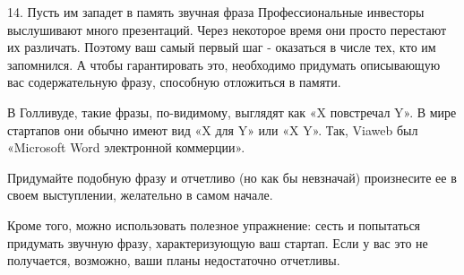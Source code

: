 \documentclass[ebook,12pt,oneside,openany]{memoir}
\begin{document}
14. Пусть им западет в память звучная фраза Профессиональные инвесторы
выслушивают много презентаций. Через некоторое время они просто
перестают их различать. Поэтому ваш самый первый шаг - оказаться в
числе тех, кто им запомнился. А чтобы гарантировать это, необходимо
придумать описывающую вас содержательную фразу, способную отложиться в
памяти.

В Голливуде, такие фразы, по-видимому, выглядят как «X повстречал Y».
В мире стартапов они обычно имеют вид «X для Y» или «X Y». Так, Viaweb
был «Microsoft Word электронной коммерции».

Придумайте подобную фразу и отчетливо (но как бы невзначай)
произнесите ее в своем выступлении, желательно в самом начале.

Кроме того, можно использовать полезное упражнение: сесть и попытаться
придумать звучную фразу, характеризующую ваш стартап. Если у вас это
не получается, возможно, ваши планы недостаточно отчетливы.
\end{document}
